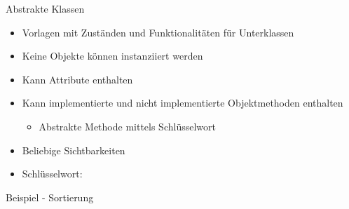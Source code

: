 \documentclass{../tuda-beamer}
\begin{document}
  \begin{frame}[c]
    
  \end{frame}

  \begin{frame}[c]
    
  \end{frame}

  \begin{frame}[c]
    
  \end{frame}

  \begin{frame}[c]
    
  \end{frame}

  \begin{frame}{Abstrakte Klassen}
    \begin{itemize}
      \item Vorlagen mit Zuständen und Funktionalitäten für Unterklassen
      \item Keine Objekte können instanziiert werden
      \item Kann Attribute enthalten
      \item Kann implementierte und nicht implementierte Objektmethoden enthalten
      \begin{itemize}
        \item Abstrakte Methode mittels Schlüsselwort 
      \end{itemize}
      \item Beliebige Sichtbarkeiten
      \item Schlüsselwort: 
    \end{itemize}
  \end{frame}

  \begin{frame}[c]{Beispiel - Sortierung}
    
  \end{frame}

  \begin{frame}[c]
    
  \end{frame}

  \begin{frame}[c]
    
  \end{frame}
\end{document}
